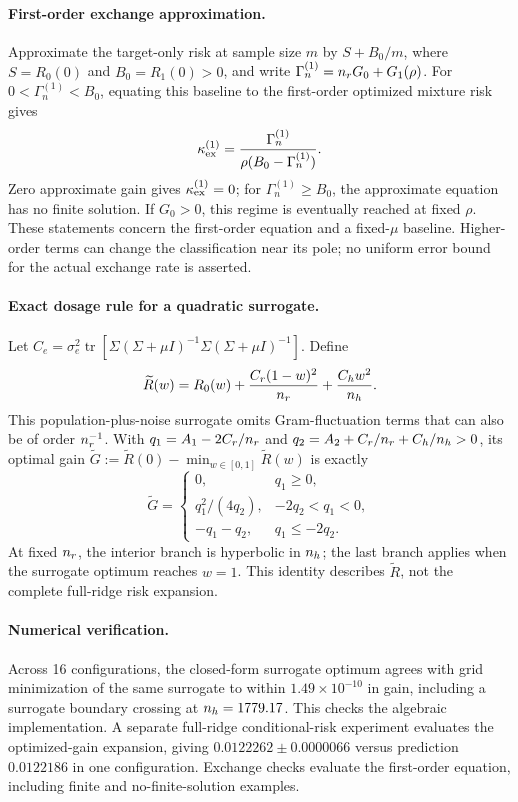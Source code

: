 \paragraph{First-order exchange approximation.}
Approximate the target-only risk at sample size $m$ by $S+B_0/m$, where $S=R_0(0)$ and $B_0=R_1(0)>0$, and write $\Gamma_n^{(1)}=n_r G_0+G_1(\rho)$. For $0<\Gamma_n^{(1)}<B_0$, equating this baseline to the first-order optimized mixture risk gives
\begin{equation}
 \kappa_{\mathrm{ex}}^{(1)}=\frac{\Gamma_n^{(1)}}{\rho(B_0-\Gamma_n^{(1)})}.
 \label{eq:fullexchange-main}
\end{equation}
Zero approximate gain gives $\kappa_{\mathrm{ex}}^{(1)}=0$; for $\Gamma_n^{(1)}\ge B_0$, the approximate equation has no finite solution. If $G_0>0$, this regime is eventually reached at fixed $\rho$. These statements concern the first-order equation and a fixed-$\mu$ baseline. Higher-order terms can change the classification near its pole; no uniform error bound for the actual exchange rate is asserted.

\paragraph{Exact dosage rule for a quadratic surrogate.}
Let $C_e=\sigma_e^2\operatorname{tr}[\Sigma(\Sigma+\mu I)^{-1}\Sigma(\Sigma+\mu I)^{-1}]$. Define
\begin{equation}
 \widetilde R(w)=R_0(w)+\frac{C_r(1-w)^2}{n_r}+\frac{C_hw^2}{n_h}.
 \label{eq:surrogate-dose}
\end{equation}
This population-plus-noise surrogate omits Gram-fluctuation terms that can also be of order $n_r^{-1}$. With $q_1=A_1-2C_r/n_r$ and $q_2=A_2+C_r/n_r+C_h/n_h>0$, its optimal gain $\widetilde G:=\widetilde R(0)-\min_{w\in[0,1]}\widetilde R(w)$ is exactly
\begin{equation}
 \widetilde G=\begin{cases}
 0,&q_1\ge0,\\
 q_1^2/(4q_2),&-2q_2<q_1<0,\\
 -q_1-q_2,&q_1\le-2q_2.
 \end{cases}
 \label{eq:surrogate-piecewise}
\end{equation}
At fixed $n_r$, the interior branch is hyperbolic in $n_h$; the last branch applies when the surrogate optimum reaches $w=1$. This identity describes $\widetilde R$, not the complete full-ridge risk expansion.

\paragraph{Numerical verification.}
Across 16 configurations, the closed-form surrogate optimum agrees with grid minimization of the same surrogate to within $1.49\times10^{-10}$ in gain, including a surrogate boundary crossing at $n_h=1779.17$. This checks the algebraic implementation. A separate full-ridge conditional-risk experiment evaluates the optimized-gain expansion, giving $0.0122262\pm0.0000066$ versus prediction $0.0122186$ in one configuration. Exchange checks evaluate the first-order equation, including finite and no-finite-solution examples.


